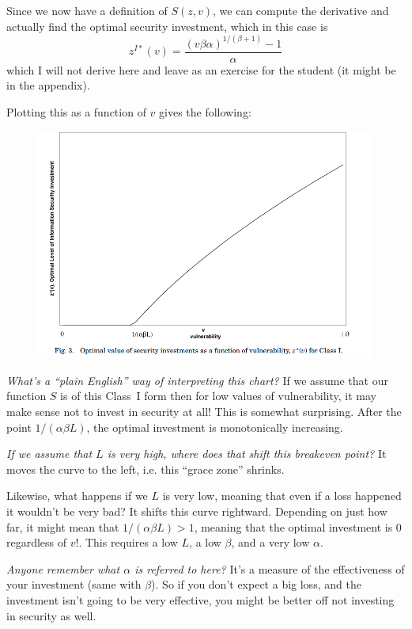 \documentclass[11pt]{article}
\begin{document}
Since we now have a definition of $S(z,v)$, we can compute the derivative and actually find the optimal security investment, which in this case is 
$$z^{I*}(v) = \frac{(v \beta \alpha )^{1/(\beta + 1)} - 1}{\alpha}$$ 
which I will not derive here and leave as an exercise for the student (it might be in the appendix).

Plotting this as a function of $v$ gives the following:
\begin{figure}[h]
    \centering
    \includegraphics*[width=4.5in]{fig3.png}
    \label{fig:fig3}
\end{figure}
\FloatBarrier

{\it What's a ``plain English'' way of interpreting this chart?} If we assume that our function $S$ is of this Class~I form then for low values of vulnerability, it may make sense not to invest in security at all! This is somewhat surprising. After the point $1/(\alpha \beta L)$, the optimal investment is monotonically increasing.

{\it If we assume that $L$ is very high, where does that shift this breakeven point?} It moves the curve to the left, i.e. this ``grace zone'' shrinks.

Likewise, what happens if we $L$ is very low, meaning that even if a loss happened it wouldn't be very bad? It shifts this curve rightward. Depending on just how far, it might mean that $1/(\alpha \beta L) > 1$, meaning that the optimal investment is 0 regardless of $v$!. This requires a low $L$, a low $\beta$, and a very low $\alpha$.

{\it Anyone remember what $\alpha$ is referred to here?} It's a measure of the effectiveness of your investment (same with $\beta$). So if you don't expect a big loss, and the investment isn't going to be very effective, you might be better off not investing in security as well.
\end{document}
